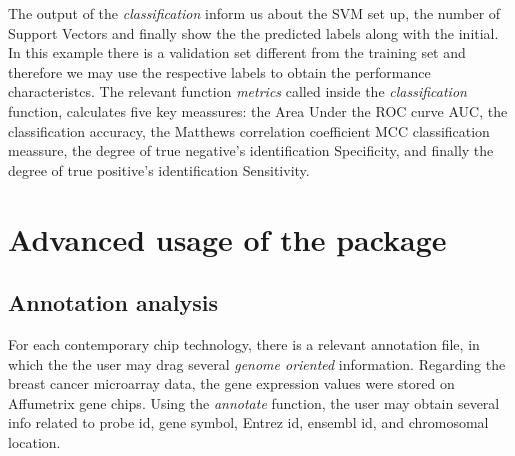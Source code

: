 \documentclass[12pt]{article}\usepackage[]{graphicx}\usepackage[usenames,dvipsnames]{color}
\makeatletter
\newenvironment{kframe}{%
 \def\at@end@of@kframe{}%
 \ifinner\ifhmode%
  \def\at@end@of@kframe{\end{minipage}}%
  \begin{minipage}{\columnwidth}%
 \fi\fi%
 \def\FrameCommand##1{\hskip\@totalleftmargin \hskip-\fboxsep
 \colorbox{shadecolor}{##1}\hskip-\fboxsep
     \hskip-\linewidth \hskip-\@totalleftmargin \hskip\columnwidth}%
 \MakeFramed {\advance\hsize-\width
   \@totalleftmargin\z@ \linewidth\hsize
   \@setminipage}}%
 {\par\unskip\endMakeFramed%
 \at@end@of@kframe}
\newenvironment{knitrout}{}{} %
\makeatother
\begin{document}
\begin{knitrout}
\begin{kframe}
{\ttfamily\noindent\itshape\color{messagecolor}{\#\# FP=1}}

{\ttfamily\noindent\itshape\color{messagecolor}{\#\# TP=4}}

{\ttfamily\noindent\itshape\color{messagecolor}{\#\# FN=0}}

{\ttfamily\noindent\itshape\color{messagecolor}{\#\# AUC=0.94}}

{\ttfamily\noindent\itshape\color{messagecolor}{\#\# Accuracy=92.00}}

{\ttfamily\noindent\itshape\color{messagecolor}{\#\# MCC=0.84}}

{\ttfamily\noindent\itshape\color{messagecolor}{\#\# Specificity=0.88}}

{\ttfamily\noindent\itshape\color{messagecolor}{\#\# Sensitivity=1.00}}\end{kframe}
\end{knitrout}

\noindent  The output of the \emph{classification} inform us about the SVM set 
up, the number of Support Vectors and finally show the the predicted labels 
along with the initial. In this example there is a validation set different from 
the training set and therefore we may use the respective labels to obtain the 
performance characteristcs. The relevant function \emph{metrics} called inside 
the \emph{classification} function, calculates five key meassures: the Area 
Under the ROC curve AUC, the classification accuracy, the Matthews correlation 
coefficient MCC classification meassure, the degree of true negative's 
identification Specificity, and finally the degree of true positive's 
identification Sensitivity.

\section{Advanced usage of the package}
\subsection{Annotation analysis}
\noindent  For each contemporary chip technology, there is a relevant annotation 
file, in which the the user may drag several \emph{genome oriented} information. 
Regarding the breast cancer microarray data, the gene expression values were 
stored on Affumetrix gene chips. Using the \emph{annotate} function, the user 
may obtain several info related to probe id, gene symbol, Entrez id, ensembl id, 
and chromosomal location.
\end{document}
